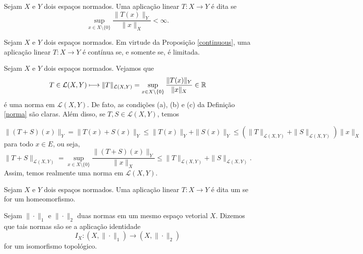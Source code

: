 \begin{definition}
Sejam $X$ e $Y$ dois espaços normados. Uma aplicação linear $T:X 
\longrightarrow Y$ é dita   
se 
\begin{equation}\label{ltdo}
\sup_{x\in X\setminus \{0\}} \frac{\|T(x)\|_Y}{\|x\|_X} 
<\infty.
\end{equation}

\end{definition}

\begin{remark}
Sejam $X$ e $Y$ dois espaços normados. Em virtude da Proposição 
\ref{continuous}, uma aplicação linear $T:X\longrightarrow Y$ é contínua 
se, e somente se, é limitada. 
\end{remark}

\begin{example}
Sejam $X$ e $Y$ dois espaços normados. Vejamos que 
\[
T\in \mathcal L (X,Y) \longmapsto \|T\|_{\mathcal L (X,Y)} = \sup_{x\in X\setminus \{0\}} \frac{\|T(x)\|_Y}{\|x\|_X} \in \mathbb{R}
\]
é uma norma em $\mathcal L (X,Y)$. De fato, as condições (a), (b) e (c) da Definição \ref{norma} são claras. Além disso, se $T,S\in \mathcal L (X,Y)$, temos

\begin{equation*}
\displaystyle \|(T+S)(x)\|_Y=\|T(x)+S(x)\|_Y \leq \|T(x)\|_Y +\|S(x)\|_Y \leq (\|T\|_{\mathcal L (X,Y)} + \|S\|_{\mathcal L (X,Y)})\|x\|_X
\end{equation*}
para todo $x\in E$, ou seja,
\begin{equation*}
    \displaystyle \|T+S\|_{\mathcal L (X,Y)}=\sup_{x\in X\setminus \{0\}} \frac{\|(T+S)(x)\|_Y}{\|x\|_X} \leq \|T\|_{\mathcal L (X,Y)}+\|S\|_{\mathcal L (X,Y)}.
\end{equation*}
Assim, temos realmente uma norma em $\mathcal L (X,Y)$.
\end{example}

\begin{definition}
Sejam $X$ e $Y$ dois espaços normados. Uma aplicação linear $T:X\longrightarrow Y$ é dita um   se for um homeomorfismo. 
\end{definition}

\begin{definition}
Sejam $\|\cdot\|_1$ e $\|\cdot\|_2$ duas normas em um mesmo espaço vetorial $X$. Dizemos que tais normas são   se a aplicação identidade
\[
\displaystyle I_X : (X,\|\cdot\|_1) \longrightarrow (X,\|\cdot\|_2)
\]
for um isomorfismo topológico.
\end{definition}

